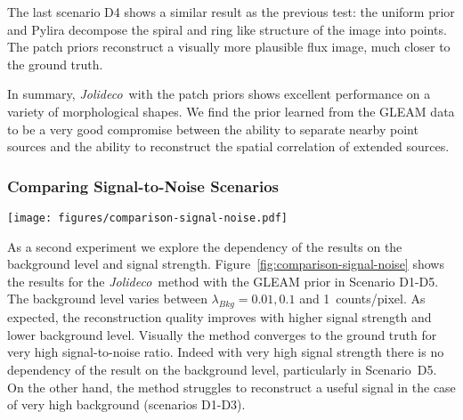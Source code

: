 \documentclass[twocolumn, lineno]{aastex631}
\newcommand{\jolideco}{\textit{Jolideco}~}
\begin{document}
    The last scenario D4 shows a similar result as the previous test: the uniform prior and Pylira decompose the spiral and ring like structure of the image into points. The patch priors reconstruct a visually more plausible flux image, much closer to the ground truth.

    In summary, \jolideco with the patch priors shows excellent performance on a variety of morphological shapes. We find the prior learned from the GLEAM data to be a very good compromise between the ability to separate nearby point sources and the ability to reconstruct the spatial correlation of extended sources.
    
    \subsubsection{Comparing Signal-to-Noise Scenarios}
    \begin{figure*}
        \begin{centering}
            \texttt{[image: figures/comparison-signal-noise.pdf]}
            \caption{
                Comparison of \jolideco with the GLEAM v0.1 prior for different background levels and signal strength, as represented by scenario D1-D5. The images are grouped by background level with each pair of columns showing the counts data in the left column and the reconstruction in the right column. The rows show the scenarios D1-D5 as described in Section~\ref{subsec:test-datasets}. Each pair of columns corresponds to a  background level,  \qty[mode = text]{0.001}{cts / pixel}, \qty[mode = text]{0.01}{cts / pixel} and \qty[mode = text]{0.1}{cts / pixel}. The complete results for the simulations and additional information are available at \url{https://jolideco.github.io/jolideco-comparison}.
            }
            \label{fig:comparison-signal-noise}
        \end{centering}
    \end{figure*}
    As a second experiment we explore the dependency of the results on the background level and signal strength. Figure~\ref{fig:comparison-signal-noise} shows the results for the \jolideco method with the GLEAM prior in Scenario D1-D5. The background level varies between $\lambda_{Bkg}= 0.01, 0.1$ and \qty[mode = text]{1}{counts/pixel}. As expected, the reconstruction quality improves with higher signal strength and lower background level. Visually the method converges to the ground truth for very high signal-to-noise ratio. Indeed with very high signal strength there is no dependency of the result on the background level, particularly in Scenario~D5. On the other hand, the method struggles to reconstruct a useful signal in the case of very high background (scenarios D1-D3). 
\end{document}
